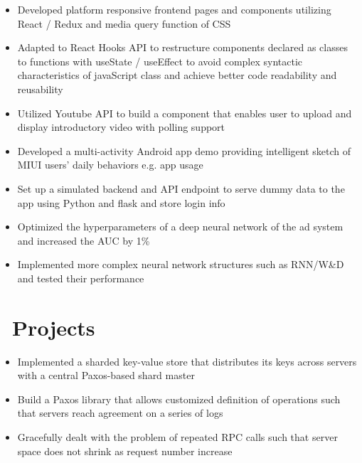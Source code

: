 \documentclass{resume}
\begin{document}
\vspace{-2ex}
\begin{itemize}
	\item Developed platform responsive frontend pages and components utilizing React / Redux and media query function of CSS
	\item Adapted to React Hooks API to restructure components declared as classes to functions with useState / useEffect to avoid complex syntactic characteristics of javaScript class and achieve better code readability and reusability
	\item Utilized Youtube API to build a component that enables user to upload and display introductory video with polling support
\end{itemize}

\vspace{-2ex}
\begin{itemize}
	\item Developed a multi-activity Android app demo providing intelligent sketch of MIUI users' daily behaviors e.g. app usage
	\item Set up a simulated backend and API endpoint to serve dummy data to the app using Python and flask and store login info
  	\item Optimized the hyperparameters of a deep neural network of the ad system and increased the AUC by 1\%
 	\item Implemented more complex neural network structures such as RNN/W\&D and tested their performance
\end{itemize}


\section{\faWrench\ Projects}
\begin{itemize}
	\item Implemented a sharded key-value store that distributes its keys across servers with a central Paxos-based shard master
	\item Build a Paxos library that allows customized definition of operations such that servers reach agreement on a series of logs
	\item Gracefully dealt with the problem of repeated RPC calls such that server space does not shrink as request number increase
\end{itemize}
\end{document}
